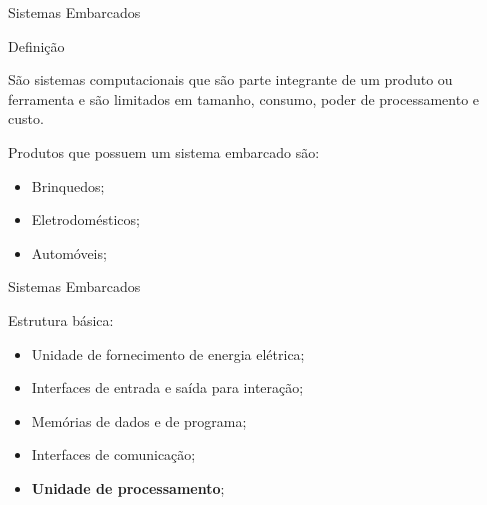 
    



\begin{frame}{Sistemas Embarcados}
    \begin{block}{Definição}
        
        São sistemas computacionais que são parte integrante de 
        um produto ou ferramenta e são limitados em tamanho, consumo, 
        poder de processamento e custo. 

        
    \end{block}


    \vspace{30pt}

    Produtos que possuem um sistema embarcado são:

    \begin{itemize}
        \item Brinquedos;
        \item Eletrodomésticos;
        \item Automóveis;
    \end{itemize}


\end{frame}




\begin{frame}{Sistemas Embarcados}

    Estrutura básica:
    \begin{itemize}
        \item Unidade de fornecimento de energia elétrica;
        \item Interfaces de entrada e saída para interação;
        \item Memórias de dados e de programa;
        \item Interfaces de comunicação;
        \item \textbf{Unidade de processamento};
        
    \end{itemize}
\end{frame}



